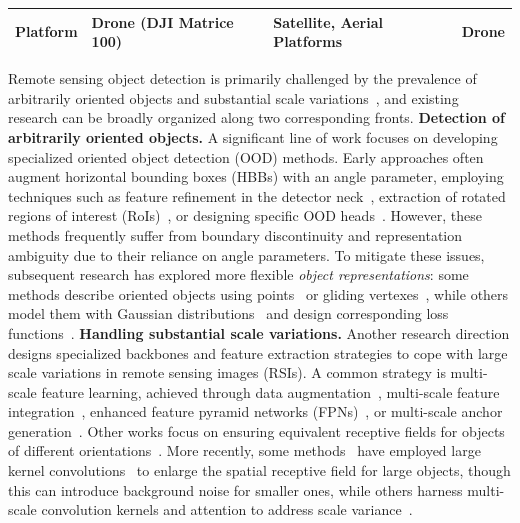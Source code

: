 \begin{table}[t]
\begin{tabular}{L{0.15\textwidth} L{0.26\textwidth} L{0.25\textwidth} L{0.25\textwidth}}
    \textbf{Platform} & Drone (DJI Matrice 100) & Satellite, Aerial Platforms & Drone \\

    \bottomrule
  \end{tabular}
\end{table}


Remote sensing object detection is primarily challenged by the prevalence of arbitrarily oriented objects and substantial scale variations~\cite{xia2018dota, ding2021object, sun2022fair1m, liu2016ship, cheng2022anchor, yao2023automated}, and existing research can be broadly organized along two corresponding fronts.
\textbf{Detection of arbitrarily oriented objects.} A significant line of work focuses on developing specialized oriented object detection (OOD) methods. Early approaches often augment horizontal bounding boxes (HBBs) with an angle parameter, employing techniques such as feature refinement in the detector neck~\cite{yang2019scrdet,yang2021r3det}, extraction of rotated regions of interest (RoIs)~\cite{ding2019learning,xie2021oriented}, or designing specific OOD heads~\cite{hou2022shape,han2021redet,ming2021dynamic}. However, these methods frequently suffer from boundary discontinuity and representation ambiguity due to their reliance on angle parameters. To mitigate these issues, subsequent research has explored more flexible \textit{object representations}: some methods describe oriented objects using points~\cite{fu2020point, li2022oriented} or gliding vertexes~\cite{xu2020gliding}, while others model them with Gaussian distributions~\cite{yang2021rethinking, yang2021learning, cheng2022dual} and design corresponding loss functions~\cite{qian2021learning}.
\textbf{Handling substantial scale variations.} Another research direction designs specialized backbones and feature extraction strategies to cope with large scale variations in remote sensing images (RSIs). A common strategy is multi-scale feature learning, achieved through data augmentation~\cite{zhao2019multi, shamsolmoali2021rotation, chen2020stitcher}, multi-scale feature integration~\cite{zhang2019hierarchical,zheng2020hynet,9382268,liu2016ssd}, enhanced feature pyramid networks (FPNs)~\cite{lin2017feature,hou2022refined,zhang2021laplacian,guo2020rotational}, or multi-scale anchor generation~\cite{guo2018geospatial, hou2021self, qiu2019a2rmnet}. Other works focus on ensuring equivalent receptive fields for objects of different orientations~\cite{han2021redet,pu2023adaptive}. More recently, some methods~\cite{Li_2023_ICCV} have employed large kernel convolutions~\cite{liu2022convnet,ding2022scaling,liu2022more} to enlarge the spatial receptive field for large objects, though this can introduce background noise for smaller ones, while others harness multi-scale convolution kernels and attention to address scale variance~\cite{guo2022segnext,dai2023multi,zhang2022multiscale,cai2024poly}.

